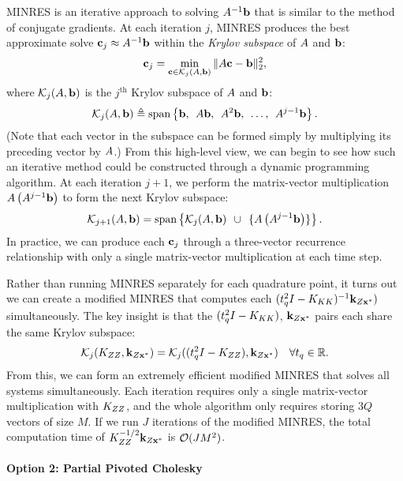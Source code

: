 MINRES  is an iterative approach to solving $A^{-1} \mathbf{b}$ that is similar to the method of conjugate gradients.
At each iteration $j$, MINRES produces the best approximate solve $\mathbf{c}_j \approx A^{-1} \mathbf{b}$ within the \emph{Krylov subspace} of $A$ and $\mathbf{b}$:
%
\[ \mathbf{c}_j = \min_{\mathbf{c} \in \mathcal{K}_j (A, \mathbf{b})} \Vert A \mathbf{c} - \mathbf{b} \Vert_2^2, \]
%
where $\mathcal{K}_j (A, \mathbf{b})$ is the $j^\text{th}$ Krylov subspace of $A$ and $\mathbf{b}$:
%
\begin{equation}
  \mathcal{K}_j (A, \mathbf{b}) \triangleq
  \text{span} \left\{
    \mathbf{b}, \:\: A \mathbf{b}, \:\: A^2 \mathbf{b}, \:\: \ldots, \:\: A^{j-1} \mathbf{b}
  \right\}.
\end{equation}
%
(Note that each vector in the subspace can be formed simply by multiplying its preceding vector by $A$.)
From this high-level view, we can begin to see how such an iterative method could be constructed through a dynamic programming algorithm.
At each iteration $j+1$, we perform the matrix-vector multiplication $A \left( A^{j-1} \mathbf{b} \right)$ to form the next Krylov subspace:
%
\[ \mathcal{K}_{j+1} (A, \mathbf{b}) = \text{span} \left\{ \mathcal{K}_{j} (A, \mathbf{b}) \:\: \cup \:\: \{ A \left( A^{j-1} \mathbf{b} \right) \} \right\}.  \]
%
In practice, we can produce each $\mathbf{c}_j$ through a three-vector recurrence relationship with only a single matrix-vector multiplication at each time step.

Rather than running MINRES separately for each quadrature point, it turns out we can create a modified MINRES that computes each $( t_q^2 I - K_{KK})^{-1} \mathbf{k}_{Z \mathbf{x}^*} )$ simultaneously.
The key insight is that the $(t_q^2 I - K_{KK})$, $\mathbf{k}_{Z \mathbf{x}^*}$ pairs each share the same Krylov subspace:
\[
  \mathcal{K}_j (K_{ZZ}, \mathbf{k}_{Z\mathbf{x}^*}) =
  \mathcal{K}_j ((t_q^2 I - K_{ZZ}), \mathbf{k}_{Z\mathbf{x}^*}) \quad \forall t_q \in \mathbb{R}.
\]
From this, we can form an extremely efficient modified MINRES that solves all systems simultaneously.
Each iteration requires only a single matrix-vector multiplication with $K_{ZZ}$, and the whole algorithm only requires storing $3Q$ vectors of size $M$.
If we run $J$ iterations of the modified MINRES, the total computation time of $K_{ZZ}^{-1/2} \mathbf{k}_{Z\mathbf{x}^*}$ is $\bigo{J M^2}$.

\paragraph{Option 2: Partial Pivoted Cholesky}

